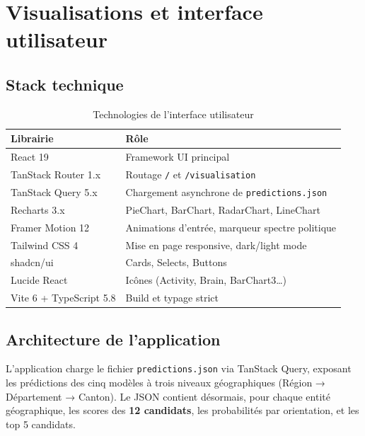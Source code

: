 \documentclass[12pt,a4paper,oneside]{report}
\newcommand{\code}[1]{\texttt{\small #1}}
\begin{document}
\chapter{Visualisations et interface utilisateur}

\section{Stack technique}

\begin{table}[H]
  \centering
  \caption{Technologies de l'interface utilisateur}
  \label{tab:stack}
  \begin{tabularx}{\textwidth}{lX}
    \toprule
    \textbf{Librairie} & \textbf{Rôle} \\
    \midrule
    React 19              & Framework UI principal \\
    TanStack Router 1.x   & Routage \code{/} et \code{/visualisation} \\
    TanStack Query 5.x    & Chargement asynchrone de \code{predictions.json} \\
    Recharts 3.x          & PieChart, BarChart, RadarChart, LineChart \\
    Framer Motion 12      & Animations d'entrée, marqueur spectre politique \\
    Tailwind CSS 4        & Mise en page responsive, dark/light mode \\
    shadcn/ui             & Cards, Selects, Buttons \\
    Lucide React          & Icônes (Activity, Brain, BarChart3\ldots) \\
    Vite 6 + TypeScript 5.8 & Build et typage strict \\
    \bottomrule
  \end{tabularx}
\end{table}

\section{Architecture de l'application}

L'application charge le fichier \texttt{predictions.json} via TanStack Query, exposant les prédictions des cinq modèles à trois niveaux géographiques (Région → Département → Canton). Le JSON contient désormais, pour chaque entité géographique, les scores des \textbf{12 candidats}, les probabilités par orientation, et les top 5 candidats.
\end{document}
